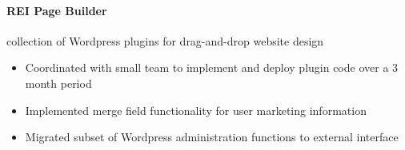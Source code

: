 \documentclass[11pt]{article}
\begin{document}
\paragraph{REI Page Builder} collection of Wordpress plugins for drag-and-drop website design
\begin{itemize}[noitemsep,leftmargin=1em]
	\item Coordinated with small team to implement and deploy plugin code over a 3 month period
	\item Implemented merge field functionality for user marketing information
	\item Migrated subset of Wordpress administration functions to external interface
\end{itemize}
\end{document}
